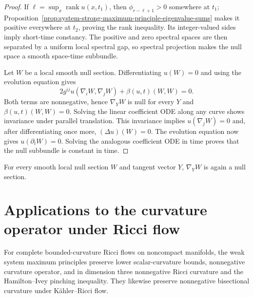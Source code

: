 \begin{proof}
\sketch
{}
If $\ell=\sup_x\operatorname{rank}u(x,t_1)$, then
$\phi_{r-\ell+1}>0$ somewhere at $t_1$; Proposition~\ref{prop:system-strong-maximum-principle-eigenvalue-sums}
makes it positive everywhere at $t_2$, proving the rank inequality.  Its
integer-valued sides imply short-time constancy.  The positive and zero
spectral spaces are then separated by a uniform local spectral gap, so
spectral projection makes the null space a smooth space-time subbundle.

Let $W$ be a local smooth null section.  Differentiating $u(W)=0$ and using
the evolution equation gives
\[
2g^{ij}u(\nabla_iW,\nabla_jW)+\beta(u,t)(W,W)=0.
\]
Both terms are nonnegative, hence $\nabla_YW$ is null for every $Y$ and
$\beta(u,t)(W,W)=0$.  Solving the linear coefficient ODE along any curve
shows invariance under parallel translation.  This invariance implies
$u(\nabla_jW)=0$ and, after differentiating once more,
$(\Delta u)(W)=0$.  The evolution equation now gives
$u(\partial_tW)=0$.  Solving the analogous coefficient ODE in time proves
that the null subbundle is constant in time.
\end{proof}

\begin{remark}
\label{rem:null-space-infinitesimal-parallel-invariance}


For every smooth local null section $W$ and tangent vector $Y$,
$\nabla_YW$ is again a null section.
\end{remark}

\section{Applications to the curvature operator under Ricci flow}

\begin{remark}
\label{rem:noncompact-ricci-flow-curvature-consequences}


For complete bounded-curvature Ricci flows on noncompact manifolds, the weak
system maximum principles preserve lower scalar-curvature bounds,
nonnegative curvature operator, and in dimension three nonnegative Ricci
curvature and the Hamilton--Ivey pinching inequality.  They likewise preserve
nonnegative bisectional curvature under K\"ahler--Ricci flow.
\end{remark}

